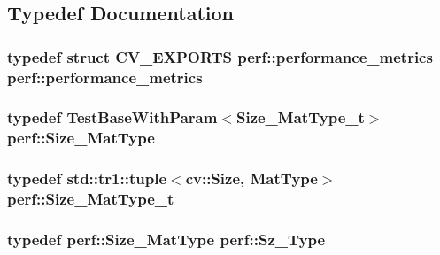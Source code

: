 \subsection{Typedef Documentation}
\hypertarget{namespaceperf_a822f7e10ad2c9baf40c200904e0b65b5}{
\subsubsection[{performance\-\_\-metrics}]{\setlength{\rightskip}{0pt plus 5cm}typedef struct {\bf C\-V\-\_\-\-E\-X\-P\-O\-R\-T\-S} {\bf perf\-::performance\-\_\-metrics}  {\bf perf\-::performance\-\_\-metrics}}}\label{namespaceperf_a822f7e10ad2c9baf40c200904e0b65b5}
\hypertarget{namespaceperf_a5592072ff8cfeb1c5501095c7d4b2059}{
\subsubsection[{Size\-\_\-\-Mat\-Type}]{\setlength{\rightskip}{0pt plus 5cm}typedef {\bf Test\-Base\-With\-Param}$<${\bf Size\-\_\-\-Mat\-Type\-\_\-t}$>$ {\bf perf\-::\-Size\-\_\-\-Mat\-Type}}}\label{namespaceperf_a5592072ff8cfeb1c5501095c7d4b2059}
\hypertarget{namespaceperf_ac1950eaa74f7a24dcfb4fe4f6fbc6cc9}{
\subsubsection[{Size\-\_\-\-Mat\-Type\-\_\-t}]{\setlength{\rightskip}{0pt plus 5cm}typedef {\bf std\-::tr1\-::tuple}$<$cv\-::\-Size, {\bf Mat\-Type}$>$ {\bf perf\-::\-Size\-\_\-\-Mat\-Type\-\_\-t}}}\label{namespaceperf_ac1950eaa74f7a24dcfb4fe4f6fbc6cc9}
\hypertarget{namespaceperf_ab354e59e542bcbd03202ffce12f238d2}{
\subsubsection[{Sz\-\_\-\-Type}]{\setlength{\rightskip}{0pt plus 5cm}typedef {\bf perf\-::\-Size\-\_\-\-Mat\-Type} {\bf perf\-::\-Sz\-\_\-\-Type}}}\label{namespaceperf_ab354e59e542bcbd03202ffce12f238d2}


